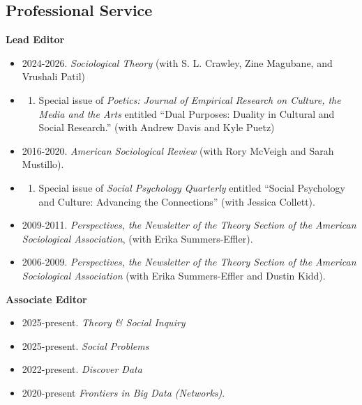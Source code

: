 \documentclass[
]{article}
\providecommand{\tightlist}{%
  \setlength{\itemsep}{0pt}\setlength{\parskip}{0pt}}
\begin{document}
\subsection{Professional Service}\label{professional-service}

\textbf{Lead Editor}

\begin{itemize}
\tightlist
\item
  2024-2026. \emph{Sociological Theory} (with S. L. Crawley, Zine
  Magubane, and Vrushali Patil)
\item
  \begin{enumerate}
  \def\labelenumi{\arabic{enumi}.}
  \setcounter{enumi}{2023}
  \tightlist
  \item
    Special issue of \emph{Poetics: Journal of Empirical Research on
    Culture, the Media and the Arts} entitled ``Dual Purposes: Duality
    in Cultural and Social Research.'' (with Andrew Davis and Kyle
    Puetz)
  \end{enumerate}
\item
  2016-2020. \emph{American Sociological Review} (with Rory McVeigh and
  Sarah Mustillo).
\item
  \begin{enumerate}
  \def\labelenumi{\arabic{enumi}.}
  \setcounter{enumi}{2013}
  \tightlist
  \item
    Special issue of \emph{Social Psychology Quarterly} entitled
    ``Social Psychology and Culture: Advancing the Connections'' (with
    Jessica Collett).
  \end{enumerate}
\item
  2009-2011. \emph{Perspectives, the Newsletter of the Theory Section of
  the American Sociological Association}, (with Erika Summers-Effler).
\item
  2006-2009. \emph{Perspectives, the Newsletter of the Theory Section of
  the American Sociological Association} (with Erika Summers-Effler and
  Dustin Kidd).
\end{itemize}

\textbf{Associate Editor}

\begin{itemize}
\tightlist
\item
  2025-present. \emph{Theory \& Social Inquiry}
\item
  2025-present. \emph{Social Problems}
\item
  2022-present. \emph{Discover Data}
\item
  2020-present \emph{Frontiers in Big Data (Networks)}.
\end{itemize}
\end{document}
